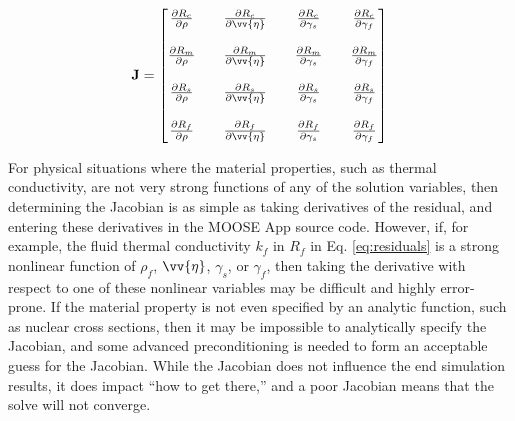 \documentclass[10pt]{article}
\numberwithin{equation}{section} %
\begin{document}
\begin{equation}
\label{eq:JacobianPRONGHORN}
\textbf{J}=\begin{bmatrix}	\frac{\partial R_c}{\partial\rho} & & \frac{\partial R_c}{\partial\vv{\eta}} & & \frac{\partial R_c}{\partial\gamma_s} & &\frac{\partial R_c}{\partial\gamma_f}\\
 & & & \\
					\frac{\partial R_m}{\partial\rho} & & \frac{\partial R_m}{\partial\vv{\eta}} & &\frac{\partial R_m}{\partial\gamma_s} & &\frac{\partial R_m}{\partial\gamma_f}\\
					 & & & \\
					\frac{\partial R_s}{\partial\rho} & &\frac{\partial R_s}{\partial\vv{\eta}} & &\frac{\partial R_s}{\partial\gamma_s} & &\frac{\partial R_s}{\partial\gamma_f}\\
					 & & & \\
					\frac{\partial R_f}{\partial\rho} & &\frac{\partial R_f}{\partial\vv{\eta}} & &\frac{\partial R_f}{\partial\gamma_s} & &\frac{\partial R_f}{\partial\gamma_f}\\
\end{bmatrix}
\end{equation}

For physical situations where the material properties, such as thermal conductivity, are not very strong functions of any of the solution variables, then determining the Jacobian is as simple as taking derivatives of the residual, and entering these derivatives in the MOOSE App source code. However, if, for example, the fluid thermal conductivity \(k_f\) in \(R_f\) in Eq. \eqref{eq:residuals} is a strong nonlinear function of \(\rho_f\), \(\vv{\eta}\), \(\gamma_s\), or \(\gamma_f\), then taking the derivative with respect to one of these nonlinear variables may be difficult and highly error-prone. If the material property is not even specified by an analytic function, such as nuclear cross sections, then it may be impossible to analytically specify the Jacobian, and some advanced preconditioning is needed to form an acceptable guess for the Jacobian. While the Jacobian does not influence the end simulation results, it does impact ``how to get there,'' and a poor Jacobian means that the solve will not converge. 
\end{document}
